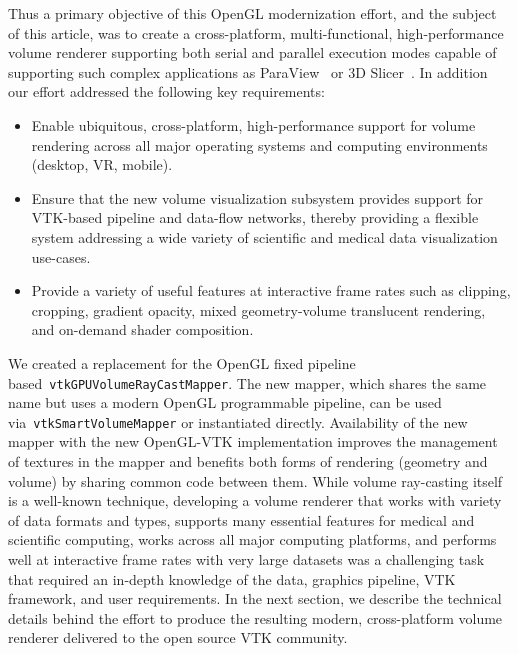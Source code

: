 Thus a primary objective of this OpenGL modernization effort, and the
subject of this article, was to create a cross-platform, multi-functional,
high-performance volume renderer supporting both serial and parallel execution
modes capable of supporting such complex applications as
ParaView~\citep{ahrens_paraview:_2005,ayachit_paraview_2015} or 3D
Slicer~\citep{fedorov_3d_2012}.
In addition our effort addressed the following key requirements:

\begin{itemize}
  \item Enable ubiquitous, cross-platform, high-performance support for volume
    rendering across all major operating systems and computing environments
    (desktop, VR, mobile).

  \item Ensure that the new volume visualization subsystem provides support for
    VTK-based pipeline and data-flow networks, thereby providing a flexible
    system addressing a wide variety of scientific and medical data
    visualization use-cases.

  \item Provide a variety of useful features at interactive frame rates such as
    clipping, cropping, gradient opacity, mixed geometry-volume translucent
    rendering, and on-demand shader composition.
\end{itemize}

We created a replacement for the OpenGL fixed pipeline
based~\texttt{vtkGPUVolumeRayCastMapper}. The new mapper, which shares the same
name but uses a modern OpenGL programmable pipeline, can be used
via~\texttt{vtkSmartVolumeMapper} or instantiated directly. Availability of the
new mapper with the new OpenGL-VTK implementation improves the management of
textures in the mapper and benefits both forms of rendering (geometry and
volume) by sharing common code between them. While volume ray-casting itself is
a well-known technique, developing a volume renderer that works with variety of
data formats and types, supports many essential features for medical and
scientific computing, works across all major computing platforms, and performs
well at interactive frame rates with very large datasets was a challenging task
that required an in-depth knowledge of the data, graphics pipeline, VTK
framework, and user requirements.  In the next section, we describe the
technical details behind the effort to produce the resulting modern,
cross-platform volume renderer delivered to the open source VTK community.

